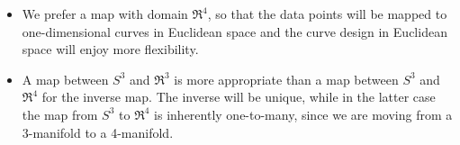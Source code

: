 \documentclass[12pt]{article}
\begin{document}
{\begin{itemize}
\item
We prefer a map with domain $\Re^4$, so that the data points will be
mapped to one-dimensional curves in Euclidean space and the 
curve design in Euclidean space will enjoy more flexibility.
\item
A map between $S^3$ and $\Re^3$ is more appropriate than a map between $S^3$ and $\Re^4$
for the inverse map.
The inverse will be unique, while in the latter case the map from $S^3$ to $\Re^4$ is
inherently one-to-many, since we are moving from a 3-manifold to a 4-manifold.
\end{itemize}

}
\end{document}
